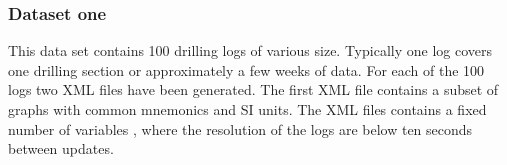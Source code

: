 \documentclass{article}
\theoremstyle{theorem}
\theoremstyle{definition}
\begin{document}
\subsubsection{Dataset one}
This data set contains 100 drilling logs of various size. Typically one log covers one drilling section or approximately a few weeks of data. For each of the 100 logs two XML files have been generated. The first XML file contains a subset of graphs with common mnemonics and SI units.  The XML files contains a fixed number of variables , where the resolution of the logs are below ten seconds between updates.
%
%
%
\end{document}
